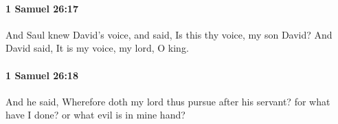 		\paragraph{1 Samuel 26:17} %
			\label{1SAMUEL-26-17}

			And Saul knew David’s voice, and said, Is this thy voice, my son David? And David said, It is my voice, my lord, O king.


		\paragraph{1 Samuel 26:18} %
			\label{1SAMUEL-26-18}

			And he said, Wherefore doth my lord thus pursue after his servant? for what have I done? or what evil is in mine hand?


